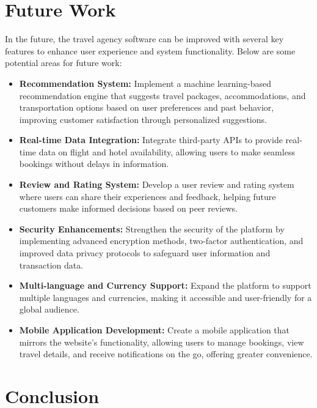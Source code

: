 \documentclass{scrreprt}
\begin{document}
\chapter{Future Work}
In the future, the travel agency software can be improved with several key features to enhance user experience and system functionality. Below are some potential areas for future work:

\begin{itemize}
    \item \textbf{Recommendation System:} Implement a machine learning-based recommendation engine that suggests travel packages, accommodations, and transportation options based on user preferences and past behavior, improving customer satisfaction through personalized suggestions.
    
    \item \textbf{Real-time Data Integration:} Integrate third-party APIs to provide real-time data on flight and hotel availability, allowing users to make seamless bookings without delays in information.
    
    \item \textbf{Review and Rating System:} Develop a user review and rating system where users can share their experiences and feedback, helping future customers make informed decisions based on peer reviews.
    
    \item \textbf{Security Enhancements:} Strengthen the security of the platform by implementing advanced encryption methods, two-factor authentication, and improved data privacy protocols to safeguard user information and transaction data.
    
    \item \textbf{Multi-language and Currency Support:} Expand the platform to support multiple languages and currencies, making it accessible and user-friendly for a global audience.
    
    \item \textbf{Mobile Application Development:} Create a mobile application that mirrors the website’s functionality, allowing users to manage bookings, view travel details, and receive notifications on the go, offering greater convenience.
\end{itemize}

\chapter{Conclusion}
\end{document}
